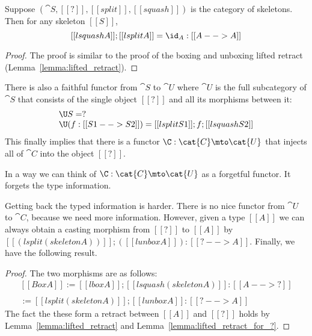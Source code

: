 \begin{lemma}
  \label{lemma:lifted_retract_for_?}
  Suppose $(\cat{S}, [[?]], [[split]],[[squash]])$ is the category of
  skeletons.  Then for any skeleton $[[S]]$,
  \[
    [[lsquash A]];[[lsplit A]] = \id_A : [[A --> A]]
  \]
\end{lemma}
\begin{proof}
  The proof is similar to the proof of the boxing and unboxing lifted
  retract (Lemma~\ref{lemma:lifted_retract}).
\end{proof}
There is also a faithful functor from $\cat{S}$ to $\cat{U}$ where
$\cat{U}$ is the full subcategory of $\cat{S}$ that consists of the
single object $[[?]]$ and all its morphisms between it:
\[
\begin{array}{lll}
  \U S = ?\\
  \U (f : [[S1 --> S2]]) = [[lsplit S1]];f;[[lsquash S2]]
\end{array}
\]
This finally implies that there is a functor $\C : \cat{C} \mto
\cat{U}$ that injects all of $\cat{C}$ into the object $[[?]]$.
\noindent
In a way we can think of $\C :  \mto {}$ as a forgetful
functor.  It forgets the type information.

Getting back the typed information is harder.  There is no nice
functor from $$ to $$, because we need more information.
However, given a type $[[A]]$ we can always obtain a casting morphism
from $[[?]]$ to $[[A]]$ by $[[(lsplit (skeleton A))]];([[lunbox A]]) :
[[? --> A]]$.  Finally, we have the following result.
\begin{proof}
  The two morphisms are as follows:
  \[
  \begin{array}{lll}
    [[Box A]] := [[lbox A]];[[lsquash (skeleton A)]] : [[A --> ?]]\\
    \\
    [[Unbox A]] := [[lsplit (skeleton A)]];[[lunbox A]] : [[? --> A]]
  \end{array}
  \]
  The fact the these form a retract between $[[A]]$ and $[[?]]$ holds
  by Lemma~\ref{lemma:lifted_retract} and
  Lemma~\ref{lemma:lifted_retract_for_?}.
\end{proof}

